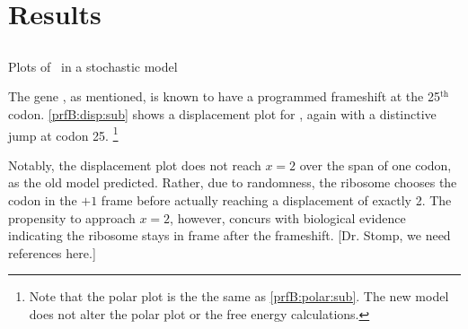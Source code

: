 \documentclass[12pt]{article}
\numberwithin{equation}{section}
\begin{document}
\section{Results}
\subsection{\prfB}

\begin{cfigure}
  \caption{Plots of \prfB\ in a stochastic model}
  \label{prfB:stochplots}
\end{cfigure}

The gene \prfB, as mentioned, is known
to have a programmed frameshift at the 25$^{\textrm{th}}$ codon.
\autoref{prfB:disp:sub} shows a displacement plot for
\prfB, again with a distinctive jump at codon 25.
\footnote{Note that the polar plot is the the same as \autoref{prfB:polar:sub}.
The new model does not alter the polar plot or the free energy calculations.}

Notably, the displacement plot does not reach $x=2$ over the span of
one codon, as the old model predicted.  Rather, due to randomness, the
ribosome chooses the codon in the $+1$ frame before actually reaching
a displacement of exactly 2.  The propensity to approach $x=2$,
however, concurs with biological evidence indicating the ribosome
stays in frame after the frameshift.  [Dr. Stomp, we need references
  here.]
  
\end{document}
